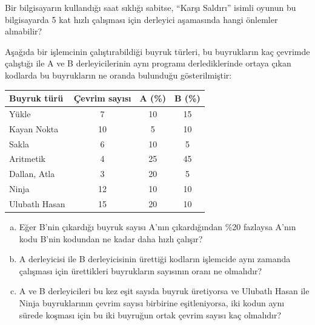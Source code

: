 \begin{alistirma}[\kolay]
Bir bilgisayarın kullandığı saat sıklığı sabitse, ``Karşı Saldırı'' isimli oyunun bu bilgisayarda 5 kat hızlı çalışması için derleyici aşamasında hangi önlemler alınabilir?
\end{alistirma}

\begin{alistirma}[\zor]
Aşağıda bir işlemcinin çalıştırabildiği buyruk türleri, bu buyrukların kaç çevrimde çalıştığı ile A ve B derleyicilerinin aynı programı derlediklerinde ortaya çıkan kodlarda bu buyrukların ne oranda bulunduğu gösterilmiştir:

\begin{center}
\small
\begin{tabular}{lccc}
\toprule
\textbf{Buyruk türü} & \textbf{Çevrim sayısı} & \textbf{A (\%)} & \textbf{B (\%)} \\
\midrule
Yükle          &  7 & 10 & 15 \\
Kayan Nokta    & 10 &  5 & 10 \\
Sakla          &  6 & 10 &  5 \\
Aritmetik      &  4 & 25 & 45 \\
Dallan, Atla   &  3 & 20 &  5 \\
Ninja          & 12 & 10 & 10 \\
Ulubatlı Hasan & 15 & 20 & 10 \\
\bottomrule
\end{tabular}
\end{center}

\begin{enumerate}[(a)]
    \item Eğer B'nin çıkardığı buyruk sayısı A'nın çıkardığından \%20 fazlaysa A'nın kodu B'nin kodundan ne kadar daha hızlı çalışır?
    \item A derleyicisi ile B derleyicisinin ürettiği kodların işlemcide aynı zamanda çalışması için ürettikleri buyrukların sayısının oranı ne olmalıdır?
    \item A ve B derleyicileri bu kez eşit sayıda buyruk üretiyorsa ve Ulubatlı Hasan ile Ninja buyruklarının çevrim sayısı birbirine eşitleniyorsa, iki kodun aynı sürede koşması için bu iki buyruğun ortak çevrim sayısı kaç olmalıdır?
\end{enumerate}
\end{alistirma}

